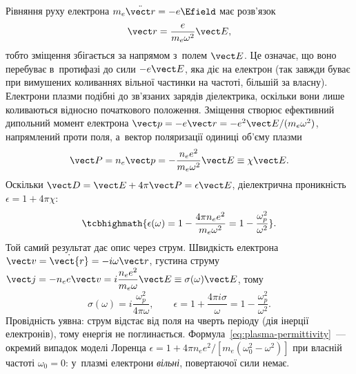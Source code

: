 Рівняння руху електрона $m_e\ddot{\vect r}=-e\Efield$ має розв'язок
\begin{equation*}
	\vect r=\frac{e}{m_e\omega^2}\vect E,
\end{equation*}
тобто зміщення збігається за напрямом з~полем $\vect E$. Це означає, що воно перебуває
в~протифазі до сили $-e\vect E$, яка діє на електрон (так завжди буває при вимушених
коливаннях вільної частинки на частоті, більшій за власну). Електрони плазми подібні до
зв'язаних зарядів діелектрика, оскільки вони лише коливаються відносно початкового
положення. Зміщення створює ефективний дипольний момент електрона $\vect p=-e\vect
	r=-e^2\vect E/(m_e\omega^2)$, напрямлений проти поля, а~вектор поляризації одиниці об'єму
плазми
\begin{equation*}
	\vect P=n_e\vect p=-\frac{n_ee^2}{m_e\omega^2}\vect E\equiv\chi\vect E.
\end{equation*}
Оскільки $\vect D=\vect E+4\pi\vect P=\epsilon\vect E$, діелектрична проникність
$\epsilon=1+4\pi\chi$:
\begin{equation}\label{eq:plasma-permittivity}
	\tcbhighmath{\epsilon(\omega)=1-\frac{4\pi n_ee^2}{m_e\omega^2}=1-\frac{\omega_p^2}{\omega^2}}.
\end{equation}
Той самий результат дає опис через струм. Швидкість електрона $\vect v=\dot{\vect{r}}=-i\omega\vect r$, густина струму $\vect j=-n_ee\vect v=i\dfrac{n_ee^2}{m_e\omega}\vect
	E\equiv\sigma(\omega)\vect E$, тому
\begin{equation}\label{eq:sigma-collisionless}
	\sigma(\omega)=i\frac{\omega_p^2}{4\pi\omega},\qquad
	\epsilon=1+\frac{4\pi i\sigma}{\omega}=1-\frac{\omega_p^2}{\omega^2}.
\end{equation}
Провідність уявна: струм відстає від поля на чверть періоду (дія інерції електронів), тому
енергія не поглинається. Формула~\eqref{eq:plasma-permittivity}~--- окремий випадок моделі
Лоренца $\epsilon=1+4\pi n_ee^2/[m_e(\omega_0^2-\omega^2)]$ при власній частоті
$\omega_0=0$: у~плазмі електрони \emph{вільні}, повертаючої сили немає.

